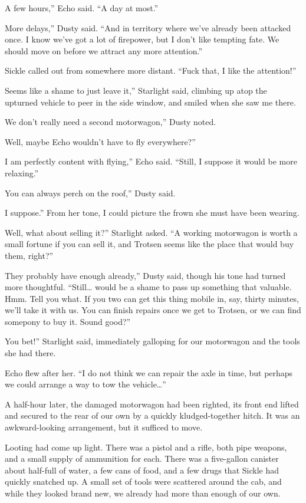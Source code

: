 \leavevmode{}A few hours,” Echo said. “A day at most.”

\leavevmode{}More delays,” Dusty said. “And in territory where we’ve already been attacked once. I know we’ve got a lot of firepower, but I don’t like tempting fate. We should move on before we attract any more attention.”

Sickle called out from somewhere more distant. “Fuck that, I like the attention!”

\leavevmode{}Seems like a shame to just leave it,” Starlight said, climbing up atop the upturned vehicle to peer in the side window, and smiled when she saw me there.

\leavevmode{}We don’t really need a second motorwagon,” Dusty noted.

\leavevmode{}Well, maybe Echo wouldn’t have to fly everywhere?”

\leavevmode{}I am perfectly content with flying,” Echo said. “Still, I suppose it would be more relaxing.”

\leavevmode{}You can always perch on the roof,” Dusty said.

\leavevmode{}I suppose.” From her tone, I could picture the frown she must have been wearing.

\leavevmode{}Well, what about selling it?” Starlight asked. “A working motorwagon is worth a small fortune if you can sell it, and Trotsen seems like the place that would buy them, right?”

\leavevmode{}They probably have enough already,” Dusty said, though his tone had turned more thoughtful. “Still… would be a shame to pass up something that valuable. Hmm. Tell you what. If you two can get this thing mobile in, say, thirty minutes, we’ll take it with us. You can finish repairs once we get to Trotsen, or we can find somepony to buy it. Sound good?”

\leavevmode{}You bet!” Starlight said, immediately galloping for our motorwagon and the tools she had there.

Echo flew after her. “I do not think we can repair the axle in time, but perhaps we could arrange a way to tow the vehicle…”

A half-hour later, the damaged motorwagon had been righted, its front end lifted and secured to the rear of our own by a quickly kludged-together hitch. It was an awkward-looking arrangement, but it sufficed to move.

Looting had come up light. There was a pistol and a rifle, both pipe weapons, and a small supply of ammunition for each. There was a five-gallon canister about half-full of water, a few cans of food, and a few drugs that Sickle had quickly snatched up. A small set of tools were scattered around the cab, and while they looked brand new, we already had more than enough of our own.

